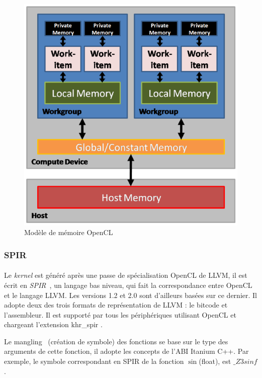 \begin{figure}[h]
   \begin{center}
      \includegraphics[scale=0.25]{./images/opencl_memory_model.png}
   \end{center}
   \caption{Modèle de mémoire OpenCL~\cite{opencl_memory_model}}
   \label{opencl_memory_model}
\end{figure}

\subsubsection{SPIR}
\paragraph{}
Le \emph{kernel} est généré après une passe de spécialisation OpenCL de LLVM, il
est écrit en \emph{SPIR}~\cite{spir}, un langage bas niveau, qui fait la
correspondance entre OpenCL et le langage LLVM. Les versions 1.2 et 2.0 sont
d'ailleurs basées sur ce dernier. Il adopte deux des trois formats de
représentation de LLVM : le bitcode et l'assembleur. Il est supporté par tous
les périphériques utilisant OpenCL et chargeant l'extension \og{} khr\_spir
\fg{}.

Le mangling~\cite{spir_mangling} (création de symbole) des fonctions se base sur
le type des arguments de cette fonction, il adopte les concepts de l'ABI Itanium
C++. Par exemple, le symbole correspondant en SPIR de la fonction $\sin$(float),
est $\_Z3sinf$.

